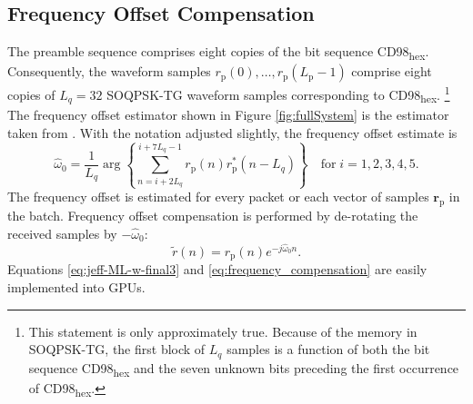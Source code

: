 \subsection{Frequency Offset Compensation}
\label{sec:freq_offset_comp}
The preamble sequence comprises eight copies of the bit sequence CD98\textsubscript{hex}.
Consequently, the waveform samples $r_\text{p}(0), \ldots , r_\text{p}(L_\text{p}-1)$ comprise 
eight copies of $L_q=32$ SOQPSK-TG waveform samples corresponding to CD98\textsubscript{hex}.%
\footnote{This statement is only approximately true. 
Because of the memory in SOQPSK-TG, the first block of $L_q$ samples is a function of both the bit sequence CD98\textsubscript{hex} and the seven unknown bits preceding the first occurrence of CD98\textsubscript{hex}.}
The frequency offset estimator shown in Figure \ref{fig:fullSystem} is the estimator taken from \cite[eq. (24)]{rice2014frequency}.
With the notation adjusted slightly, the frequency offset estimate is
\begin{equation}
	\hat{\omega}_0 = \frac{1}{L_q} \arg\left\{ \sum_{n=i+2L_q}^{i+7L_q-1} r_\text{p}(n)r_\text{p}^\ast(n-L_q)\right\}
	\quad
\text{for} \;
i=1,2,3,4,5.
	\label{eq:jeff-ML-w-final3}
\end{equation}
The frequency offset is estimated for every packet or each vector of samples $\mathbf{r}_\text{p}$ in the batch.
Frequency offset compensation is performed by de-rotating the received samples by $-\hat{\omega}_0$:
\begin{equation}
	\tilde{r}(n) = r_\text{p}(n) e^{-j\hat{\omega}_0n}.
	\label{eq:frequency_compensation}
\end{equation}
Equations \eqref{eq:jeff-ML-w-final3} and \eqref{eq:frequency_compensation} are easily implemented into GPUs. 

